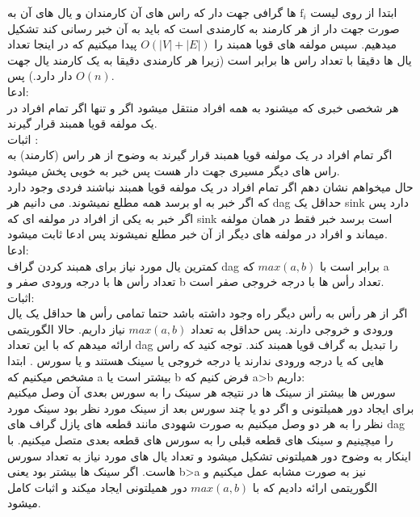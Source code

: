 \problem{}
ابتدا از روی لیست 
$\text{f}_i$
 ها گرافی جهت دار که راس های آن
کارمندان و یال های آن به صورت جهت دار از هر کارمند به کارمندی است که باید
به آن خبر رسانی کند تشکیل میدهیم.
سپس مولفه های قویا همبند را $O(|V|+|E|)$ پیدا میکنیم که در اینجا
تعداد یال ها دقیقا با تعداد راس ها برابر است (زیرا هر کارمندی دقیقا به یک کارمند یال جهت دار دارد.)
پس $O(n)$.\\
ادعا:\\
هر شخصی خبری که میشنود به همه افراد منتقل میشود اگر و تنها اگر تمام افراد در یک مولفه
قویا همبند قرار گیرند.\\
اثبات :\\
اگر تمام افراد در یک مولفه قویا همبند قرار گیرند به وضوح از هر راس (کارمند)
به راس های دیگر مسیری جهت دار هست پس خبر به خوبی پخش میشود.\\
حال میخواهم نشان دهم اگر تمام افراد در یک مولفه قویا همبند نباشند 
فردی وجود دارد که اگر خبر به او برسد همه مطلع نمیشوند.
می دانیم هر dag حداقل یک sink دارد پس
اگر خبر به یکی از افراد در مولفه ای که sink است برسد
خبر فقط در همان مولفه میماند و افراد در مولفه های دیگر از آن خبر
مطلع نمیشوند پس ادعا ثابت میشود.\\
ادعا:\\
کمترین یال مورد نیاز برای همبند کردن گراف dag
برابر است با $max(a,b)$ که a تعداد رأس ها
با درجه ورودی صفر و b تعداد رأس ها با درجه خروجی صفر است.\\
اثبات:\\
اگر از هر رأس به رأس دیگر راه وجود داشته باشد حتما تمامی رأس ها
حداقل یک یال ورودی و خروجی دارند.
پس حداقل به تعداد $max(a,b)$ نیاز داریم.
حالا الگوریتمی ارائه میدهم که با این تعداد 
dag را تبدیل به گراف قویا همبند کند.
توجه کنید که راس هایی که یا درجه ورودی ندارند یا درجه خروجی یا 
سینک هستند و یا سورس .
ابتدا مشخص میکنیم که a بیشتر است یا b 
فرض کنیم که a>b داریم:\\
سورس ها بیشتر از سینک ها در نتیجه هر سینک را به سورس بعدی آن وصل میکنیم
برای ایجاد دور همیلتونی و اگر دو یا چند سورس بعد از سینک مورد نظر بود
سینک مورد نظر را به هر دو وصل میکنیم
به صورت شهودی مانند قطعه های پازل گراف های dag را میچینیم و سینک های قطعه قبلی
را به سورس های قطعه بعدی متصل میکنیم.
با اینکار به وضوح دور همیلتونی تشکیل میشود و تعداد یال های مورد نیاز به تعداد
سورس هاست.
اگر سینک ها بیشتر بود یعنی b>a نیز به صورت مشابه عمل میکنیم و الگوریتمی ارائه دادیم که
با $max(a,b)$ دور همیلتونی ایجاد میکند و اثبات کامل میشود.